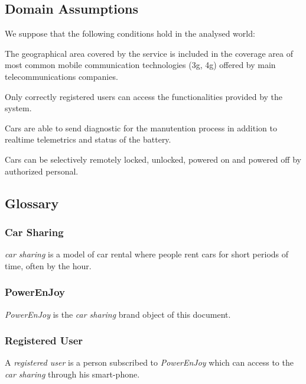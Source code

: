 \documentclass[english]{article}
\newcommand{\carsharing}{\textit {car sharing }}
\newcommand{\powerenjoy}{\textit{PowerEnJoy }}
\newcommand{\registereduser}{\textit {registered user }}
\begin{document}
	\subsection{Domain Assumptions }
	We suppose that the following conditions hold in the analysed world:
	\begin{description}
		

		\item [D.1]{ The geographical area covered by the service is included in the coverage area of most common mobile communication technologies (3g, 4g) offered by main telecommunications companies. }
		\item [D.2]{ Only correctly registered users can access the functionalities provided by the system. }
		\item [D.3]{ Cars are able to send diagnostic for the manutention process in addition to realtime telemetrics and status of the battery.  }
		\item [D.]{ Cars can be selectively remotely locked, unlocked, powered on and powered off by authorized personal. }
		\item [D.]{  }
		\item [D.]{  }
		\item [D.]{  }
		\item [D.]{  }
		\item [D.]{  }
		\item [D.]{  }	

	\end{description}

	\subsection{Glossary}
		\subsubsection{Car Sharing}
			\carsharing is a model of car rental where people rent cars for short periods of time, often by the hour.
		\subsubsection{PowerEnJoy}
			\powerenjoy is the \carsharing brand object of this document. 
		\subsubsection{Registered User}
			A \registereduser is a person subscribed to \powerenjoy which can access to the \carsharing through his smart-phone.
\end{document}
